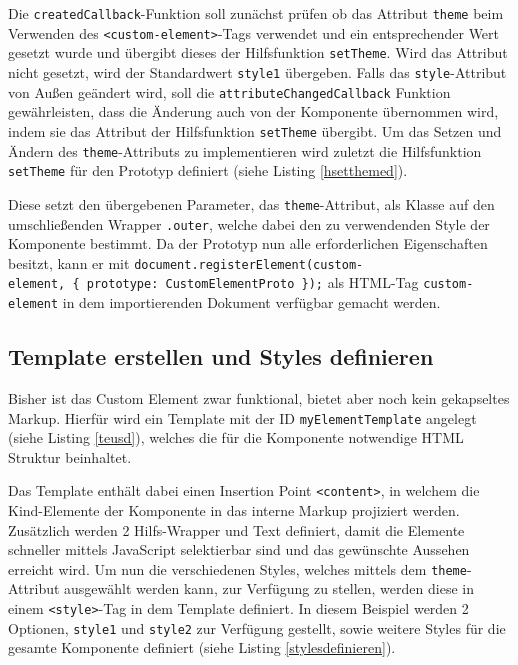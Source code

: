 Die \texttt{createdCallback}-Funktion soll zunächst prüfen ob das Attribut \texttt{theme} beim Verwenden des
\texttt{\textless{}custom-element\textgreater{}}-Tags verwendet und ein entsprechender Wert gesetzt wurde und übergibt dieses der Hilfsfunktion \texttt{setTheme}. Wird das Attribut nicht gesetzt, wird der Standardwert \texttt{style1} übergeben. Falls das \texttt{style}-Attribut von Außen geändert wird, soll die \texttt{attributeChangedCallback} Funktion gewährleisten, dass die Änderung auch von der Komponente übernommen wird, indem sie das Attribut der Hilfsfunktion \texttt{setTheme} übergibt. Um das Setzen und Ändern des \texttt{theme}-Attributs zu implementieren wird zuletzt die Hilfsfunktion \texttt{setTheme} für den Prototyp definiert (siehe Listing \ref{hsetthemed}).



Diese setzt den übergebenen Parameter, das \texttt{theme}-Attribut, als Klasse auf den umschließenden Wrapper \texttt{.outer}, welche dabei den zu verwendenden Style der Komponente bestimmt. Da der Prototyp nun alle erforderlichen Eigenschaften besitzt, kann er mit \texttt{document.registerElement(\dq custom-element\dq,\ \{\ prototype:\ CustomElementProto\ \});} als \ac{HTML}-Tag \texttt{custom-element} in dem importierenden Dokument verfügbar gemacht werden.


\subsection{Template erstellen und Styles definieren}\label{template-erstellen-und-styles-definieren}

Bisher ist das Custom Element zwar funktional, bietet aber noch kein gekapseltes Markup. Hierfür wird ein Template mit der ID \texttt{myElementTemplate} angelegt (siehe Listing \ref{teusd}), welches die für die Komponente notwendige \ac{HTML} Struktur beinhaltet.



Das Template enthält dabei einen Insertion Point \texttt{\textless{}content\textgreater{}}, in welchem die Kind-Elemente der Komponente in das interne Markup projiziert werden. Zusätzlich werden 2 Hilfs-Wrapper und Text definiert, damit die Elemente schneller mittels JavaScript selektierbar sind und das gewünschte Aussehen erreicht wird. Um nun die verschiedenen Styles, welches mittels dem \texttt{theme}-Attribut ausgewählt werden kann, zur Verfügung zu stellen, werden diese in einem \texttt{\textless{}style\textgreater{}}-Tag in dem Template definiert. In diesem Beispiel werden 2 Optionen, \texttt{style1} und \texttt{style2} zur Verfügung gestellt, sowie weitere Styles für die gesamte Komponente definiert (siehe Listing \ref{stylesdefinieren}).

